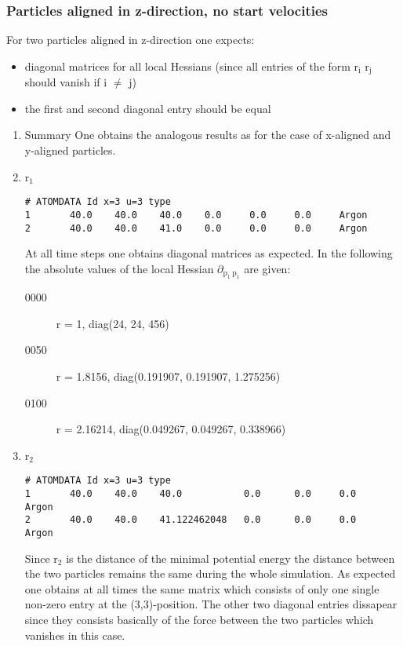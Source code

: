 \documentclass[11pt]{article}
\begin{document}
\subsubsection{Particles aligned in z-direction, no start velocities}
\label{sec-1-4-3}
For two particles aligned in z-direction one expects:
\begin{itemize}
\item diagonal matrices for all local Hessians (since all entries of the form r$_{\text{i}}$ r$_{\text{j}}$ should vanish if i $\neq$ j)
\item the first and second diagonal entry should be equal
\end{itemize}
\begin{enumerate}
\item Summary
\label{sec-1-4-3-1}
One obtains the analogous results as for the case of x-aligned and y-aligned particles.
\item r$_{\text{1}}$
\label{sec-1-4-3-2}
\begin{verbatim}
# ATOMDATA Id x=3 u=3 type
1       40.0    40.0    40.0    0.0     0.0     0.0     Argon
2       40.0    40.0    41.0    0.0     0.0     0.0     Argon
\end{verbatim}
At all time steps one obtains diagonal matrices as expected.
In the following the absolute values of the local Hessian $\partial$$_{\text{p}_{\text{1}} \ \text{p}_{\text{1}}}$ are given:
\begin{description}
\item[{0000}] r = 1, diag(24, 24, 456)
\item[{0050}] r = 1.8156, diag(0.191907, 0.191907,  1.275256)
\item[{0100}] r = 2.16214, diag(0.049267, 0.049267, 0.338966)
\end{description}
\item r$_{\text{2}}$
\label{sec-1-4-3-3}
\begin{verbatim}
# ATOMDATA Id x=3 u=3 type
1       40.0    40.0    40.0           0.0      0.0     0.0     Argon
2       40.0    40.0    41.122462048   0.0      0.0     0.0     Argon
\end{verbatim}
Since r$_{\text{2}}$ is the distance of the minimal potential energy the distance between the two particles remains the same during the whole simulation.
As expected one obtains at all times the same matrix which consists of only one single non-zero entry at the (3,3)-position.
The other two diagonal entries dissapear since they consists basically of the force between the two particles which vanishes in this case.
$$
\end{enumerate}
\end{document}
